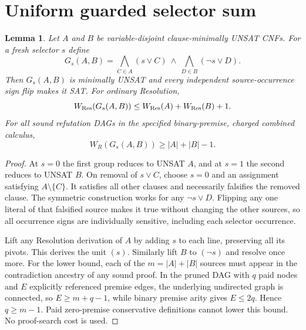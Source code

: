 \documentclass[11pt]{article}
\newtheorem{lemma}{Lemma}
\begin{document}
\section*{Uniform guarded selector sum}
\begin{lemma}
Let $A$ and $B$ be variable-disjoint clause-minimally UNSAT CNFs. For a fresh selector $s$ define
\[
G_s(A,B)=\bigwedge_{C\in A}(s\vee C)\ \wedge\
\bigwedge_{D\in B}(\neg s\vee D).
\]
Then $G_s(A,B)$ is minimally UNSAT and every independent source-occurrence sign flip makes it SAT. For ordinary Resolution,
\[
W_{\rm Res}(G_s(A,B))\le W_{\rm Res}(A)+W_{\rm Res}(B)+1.
\]
For all sound refutation DAGs in the specified binary-premise, charged combined calculus,
\[
W_R(G_s(A,B))\ge |A|+|B|-1.
\]
\end{lemma}
\begin{proof}
At $s=0$ the first group reduces to UNSAT $A$, and at $s=1$ the second reduces to UNSAT $B$. On removal of $s\vee C$, choose $s=0$ and an assignment satisfying $A\setminus\{C\}$. It satisfies all other clauses and necessarily falsifies the removed clause. The symmetric construction works for any $\neg s\vee D$. Flipping any one literal of that falsified source makes it true without changing the other sources, so all occurrence signs are individually sensitive, including each selector occurrence.

Lift any Resolution derivation of $A$ by adding $s$ to each line, preserving all its pivots. This derives the unit $(s)$. Similarly lift $B$ to $(\neg s)$ and resolve once more. For the lower bound, each of the $m=|A|+|B|$ sources must appear in the contradiction ancestry of any sound proof. In the pruned DAG with $q$ paid nodes and $E$ explicitly referenced premise edges, the underlying undirected graph is connected, so $E\ge m+q-1$, while binary premise arity gives $E\le 2q$. Hence $q\ge m-1$. Paid zero-premise conservative definitions cannot lower this bound. No proof-search cost is used.
\end{proof}
\end{document}
